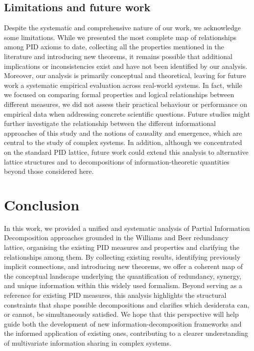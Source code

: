 \documentclass{article}
\begin{document}
\subsection{Limitations and future work}
Despite the systematic and comprehensive nature of our work, we acknowledge some limitations.
While we presented the most complete map of relationships among PID axioms to date, collecting all the properties mentioned in the literature and introducing new theorems, it remains possible that additional implications or inconsistencies exist and have not been identified by our analysis.
Moreover, our analysis is primarily conceptual and theoretical, leaving for future work a systematic empirical evaluation across real-world systems.
In fact, while we focused on comparing formal properties and logical relationships between different measures, we did not assess their practical behaviour or performance on empirical data when addressing concrete scientific questions.
Future studies might further investigate the relationship between the different informational approaches of this study and the notions of causality and emergence, which are central to the study of complex systems.
In addition, although we concentrated on the standard PID lattice, future work could extend this analysis to alternative lattice structures and to decompositions of information-theoretic quantities beyond those considered here.


\section{Conclusion}

In this work, we provided a unified and systematic analysis of Partial Information Decomposition approaches grounded in the Williams and Beer redundancy lattice, organising the existing PID measures and properties and clarifying the relationships among them.
By collecting existing results, identifying previously implicit connections, and introducing new theorems, we offer a coherent map of the conceptual landscape underlying the quantification of redundancy, synergy, and unique information within this widely used formalism.
Beyond serving as a reference for existing PID measures, this analysis highlights the structural constraints that shape possible decompositions and clarifies which desiderata can, or cannot, be simultaneously satisfied.
We hope that this perspective will help guide both the development of new information-decomposition frameworks and the informed application of existing ones, contributing to a clearer understanding of multivariate information sharing in complex systems.
\end{document}
